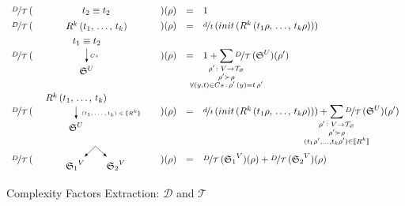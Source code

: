 \begin{figure}[t]
\[
\begin{array}{rclcl}
 \mathcal{\nicefrac{D}{T}}\,(&\parbox[m]{1.3cm}{\schemenode{$\unigoal{t_2}{t_2}$}}&)(\rho) &=& 1  \\

 \mathcal{\nicefrac{D}{T}}\,(&\parbox[m]{2.5cm}{\schemenode{$\invokegoal{R^k}{t_1}{t_k}$}}&)(\rho) &=& \nicefrac{d}{t}\,(init\,(\invokegoal{R^k}{t_1 \rho}{t_k \rho})) \\

 \mathcal{\nicefrac{D}{T}}\,(&\parbox[m]{2cm}{\schemesarrow{$\unigoal{t_1}{t_2}$}{$Cs$}{$\schemewithvset{\mathfrak{S}}{U}$}} &)(\rho) &=& 1 +
      \smashoperator{\sum\limits_{\substack{ \rho' \colon V \to \grterms \\
                                      \rho' \succ \rho \\
                                      \forall (y, t) \in Cs\,:\, \rho'\,(y) = t\, \rho'  }}}
           \mathcal{\nicefrac{D}{T}}\,(\schemewithvset{\mathfrak{S}}{U})(\rho')  \\

 \mathcal{\nicefrac{D}{T}}\,(& \parbox[m]{4cm}{\schemedarrow{$\invokegoal{R^k}{t_1}{t_k}$}{ $(t_1, \dots, t_k) \in \sembr{R^k}  $}{$\schemewithvset{\mathfrak{S}}{U}$}} &)(\rho) &=&
      \nicefrac{d}{t}\,(init\,(\invokegoal{R^k}{t_1 \rho}{t_k \rho})) +
      \smashoperator{\sum\limits_{\substack{ \rho' \colon V \to \grterms \\
                                      \rho' \succ \rho \\
                                      (t_1 \rho', \dots, t_k \rho') \in \sembr{R^k}  }}}
           \mathcal{\nicefrac{D}{T}}\,(\schemewithvset{\mathfrak{S}}{U})(\rho')  \\

 \mathcal{\nicefrac{D}{T}}\,(&\parbox[m]{2.5cm}{\schemefork{$\schemewithvset{\mathfrak{S}_1}{V}$}{$\schemewithvset{\mathfrak{S}_2}{V}$}}&)(\rho) &=&
 \mathcal{\nicefrac{D}{T}}\,(\schemewithvset{\mathfrak{S}_1}{V})(\rho) + \mathcal{\nicefrac{D}{T}}\,(\schemewithvset{\mathfrak{S}_2}{V})(\rho)
\end{array}
\]
\caption{Complexity Factors Extraction: $\mathcal D$ and $\mathcal T$}
\label{fig:scheduling_extraction_d_t}
\end{figure}



